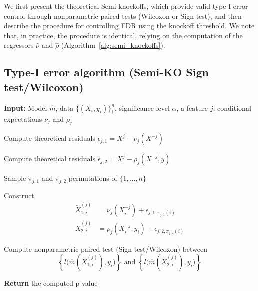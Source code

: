 \documentclass{article}
\theoremstyle{plain}
\theoremstyle{definition}
\theoremstyle{remark}
\begin{document}
We first present the theoretical Semi-knockoffs, which provide valid type-I error control through nonparametric paired tests (Wilcoxon or Sign test), and then describe the procedure for controlling FDR using the knockoff threshold. We note that, in practice, the procedure is identical, relying on the computation of the regressors $\widehat{\nu}$ and $\widehat{\rho}$ (Algorithm~\ref{alg:semi_knockoffs}).


\subsection{Type-I error algorithm (Semi-KO Sign test/Wilcoxon)}



\begin{algorithm}[H]
\caption{Oracle Semi-knockoffs Sign-Test/Wilcoxon (Semi-KO ST/Wilcox)}
\label{alg:semi_knockoffs_oracle_wcx}
\begin{algorithmic}[1]
\item[] \textbf{Input:} Model $\widehat{m}$, data $\{(X_i,y_i)\}_i^n$, significance level $\alpha$, a feature $j$, conditional expectations $\nu_j$ and $\rho_j $
    \item[] Compute theoretical residuals $\epsilon_{j,1} = X^j -\nu_j(X^{-j})$
    \item[] Compute theoretical residuals $\epsilon_{j,2} = X^j - \rho_j(X^{-j}, y)$
    \item[] Sample $\pi_{j,1}$ and $\pi_{j,2}$ permutations of $\{1,\dots,n\}$
    \item[] Construct 
    \begin{align*}
        \widetilde{X}^{(j)}_{1,i}
        &= \nu_j(X^{-j}_i)
        + \epsilon_{j,1,\pi_{j,1}(i)}\\
        \widetilde{X}^{(j)}_{2,i}
        &= \rho_j(X^{-j}_i, y_i)
        + \epsilon_{j,2,\pi_{j,2}(i)}
    \end{align*}
    \item[] Compute nonparametric paired test (Sign-test/Wilcoxon) between %
    \[
        \left\{l\bigl(\widehat{m}(\widetilde{X}^{(j)}_{1,i}), y_i\bigr)\right\}
        \text{ and }
        \left\{l\bigl(\widehat{m}(\widetilde{X}^{(j)}_{2,i}), y_i\bigr)\right\}
    \]
\item[] \textbf{Return} the computed p-value
\end{algorithmic}
\label{alg:theo-semi-KO-wilcox}
\end{algorithm}
\end{document}
